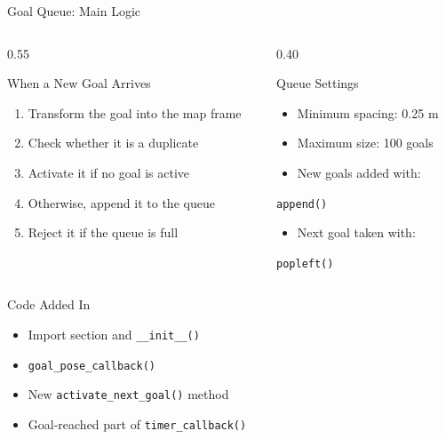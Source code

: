 \documentclass[aspectratio=169, 11pt]{beamer}
\begin{document}
\begin{frame}[t,shrink=8]{Goal Queue: Main Logic}

\begin{columns}[T,onlytextwidth]

\begin{column}{0.55\textwidth}
\begin{block}{When a New Goal Arrives}
\begin{enumerate}
    \item Transform the goal into the map frame
    \item Check whether it is a duplicate
    \item Activate it if no goal is active
    \item Otherwise, append it to the queue
    \item Reject it if the queue is full
\end{enumerate}
\end{block}
\end{column}

\begin{column}{0.40\textwidth}
\begin{block}{Queue Settings}
\begin{itemize}
    \item Minimum spacing: 0.25 m
    \item Maximum size: 100 goals
    \item New goals added with:
\end{itemize}

\begin{center}
\texttt{append()}
\end{center}

\begin{itemize}
    \item Next goal taken with:
\end{itemize}

\begin{center}
\texttt{popleft()}
\end{center}
\end{block}
\end{column}

\end{columns}

\vspace{0.2cm}

\begin{block}{Code Added In}
\begin{itemize}
    \item Import section and \texttt{\_\_init\_\_()}
    \item \texttt{goal\_pose\_callback()}
    \item New \texttt{activate\_next\_goal()} method
    \item Goal-reached part of \texttt{timer\_callback()}
\end{itemize}
\end{block}

\end{frame}
\end{document}
